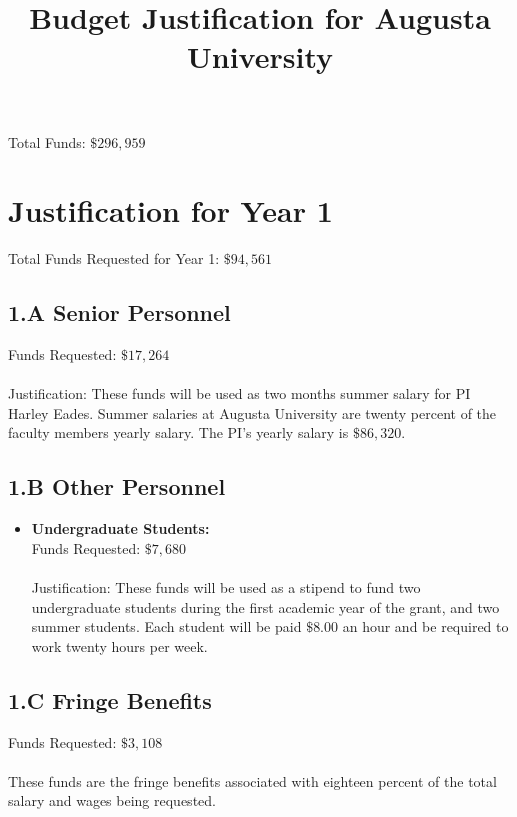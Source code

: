 \documentclass[11pt]{article}
\title{\vspace{-50px}Budget Justification for Augusta University}
\date{\vspace{-60px}}
\begin{document}
\maketitle  

\noindent
Total Funds: $\$296,959$\\
\vspace{-20px}
\section{Justification for Year 1}
\label{sec:year_1}
Total Funds Requested for Year 1: $\$94,561$\\
\vspace{-20px}
\subsection*{1.A Senior Personnel}
\label{subsec:a_senior_personnel}

Funds Requested: $\$17,264$\\
\ \\
Justification: These funds will be used as two months summer salary
for PI Harley Eades.  Summer salaries at Augusta University are twenty
percent of the faculty members yearly salary.  The PI's yearly salary
is $\$86,320$.


\subsection*{1.B Other Personnel}
\label{subsec:personnel}
\begin{itemize}

\item \textbf{Undergraduate Students:}\\ Funds Requested:
  $\$7,680$\\ \ \\ Justification: These funds will be used as a
  stipend to fund two undergraduate students during the first academic
  year of the grant, and two summer students.  Each student will be
  paid $\$8.00$ an hour and be required to work twenty hours per week.
\end{itemize}

\subsection*{1.C Fringe Benefits}
\label{subsec:c_fringe_benefits}
Funds Requested: $\$3,108$\\
\ \\
These funds are the fringe benefits associated with eighteen percent
of the total salary and wages being requested.  
\end{document}
